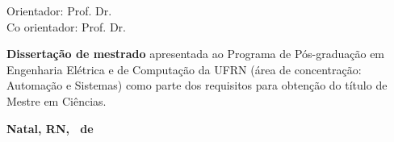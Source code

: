 \begin{titlepage}
\begin{center}

\LARGE
\textbf{\titulo}

\vfill

\Large
\textbf{\autor}

\vfill

\normalsize
Orientador: Prof. Dr. \orientador
\\[2ex] Co orientador: Prof. Dr. \coorientador

\vfill

\hfill
\parbox{0.5\linewidth}{\textbf{Dissertação de mestrado} apresentada ao
Programa de Pós-graduação em Engenharia Elétrica e de Computação da UFRN (área
de concentração: Automação e Sistemas) como parte dos requisitos para obtenção
do título de Mestre em Ciências.}

\vfill

\large
\textbf{Natal, RN, \Mesaprovacao\ de \Anoaprovacao}

\end{center}

\end{titlepage}
